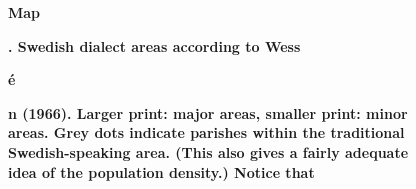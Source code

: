 \begin{stylecaption}

\end{stylecaption}

\begin{figure}[h]

\begin{minipage}{5.0839in}

\bfseries
Map 

\end{minipage}

\end{figure}

\begin{stylecaption}

\end{stylecaption}

\begin{figure}[h]

\begin{minipage}{5.0839in}

\bfseries
. Swedish dialect areas according to Wess

\end{minipage}

\end{figure}

\begin{stylecaption}

\end{stylecaption}

\begin{figure}[h]

\begin{minipage}{5.0839in}

\bfseries
é

\end{minipage}

\end{figure}

\begin{stylecaption}

\end{stylecaption}

\begin{figure}[h]

\begin{minipage}{5.0839in}

\bfseries
n (1966). Larger print: major areas, smaller print: minor areas. Grey dots indicate parishes within the traditional Swedish-speaking area. (This also gives a fairly adequate idea of the population density.) Notice that 

\end{minipage}

\end{figure}

